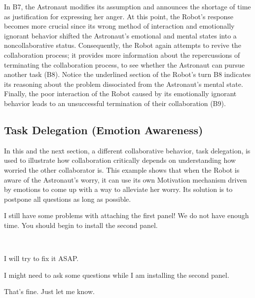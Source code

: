 In B7, the Astronaut modifies its assumption and announces the shortage of time
as justification for expressing her anger. At this point, the Robot's response
becomes more crucial since its wrong method of interaction and
emotionally ignorant behavior shifted the Astronaut's emotional and mental
states into a noncollaborative status. Consequently, the Robot again attempts to
revive the collaboration process; it provides more information about the
repercussions of terminating the collaboration process, to see whether the
Astronaut can pursue another task (B8). Notice the underlined section of the
Robot's turn B8 indicates its reasoning about the problem dissociated from the
Astronaut's mental state. Finally, the poor interaction of the Robot caused by
its emotionally ignorant behavior leads to an unsuccessful termination of their
collaboration (B9).

\subsection{Task Delegation (Emotion Awareness)}
\label{sec:exp3}

In this and the next section, a different collaborative behavior, task
delegation, is used to illustrate how collaboration critically depends on
understanding how worried the other collaborator is. This example shows that
when the Robot is aware of the Astronaut's worry, it can use its own Motivation
mechanism driven by emotions to come up with a way to alleviate her worry. Its
solution is to postpone all questions as long as possible. 

\begin{description}
  \item \textit{\textbf{\fontsize{9pt}{12pt}\selectfont{C1. Astronaut:}}} I
  still have some problems with attaching the first panel! We do not have enough
  time. You should begin to install the second panel.\\

  \item {}\\

  \item \textit{\textbf{\fontsize{9pt}{12pt}\selectfont{C3. Astronaut:}}} I will
  try to fix it ASAP.\\

  \item \textit{\textbf{\fontsize{9pt}{12pt}\selectfont{C4. Robot:}}} I might
  need to ask some questions while I am installing the second panel.\\

  \item \textit{\textbf{\fontsize{9pt}{12pt}\selectfont{C5. Astronaut:}}} That's
  fine. Just let me know.
  
\end{description}


